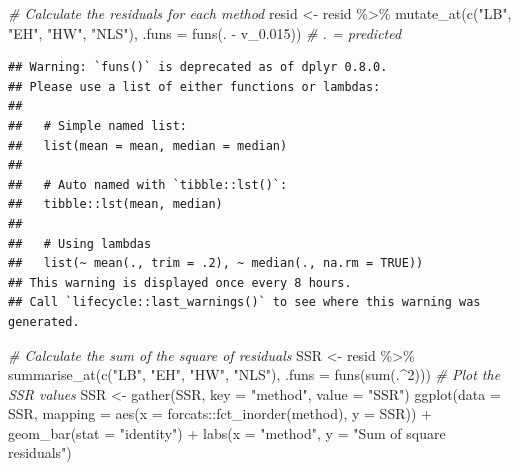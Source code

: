 \documentclass[
]{article}
\newenvironment{Shaded}{\begin{snugshade}}{\end{snugshade}}
\newcommand{\AttributeTok}[1]{\textcolor[rgb]{0.77,0.63,0.00}{#1}}
\newcommand{\CommentTok}[1]{\textcolor[rgb]{0.56,0.35,0.01}{\textit{#1}}}
\newcommand{\DecValTok}[1]{\textcolor[rgb]{0.00,0.00,0.81}{#1}}
\newcommand{\FloatTok}[1]{\textcolor[rgb]{0.00,0.00,0.81}{#1}}
\newcommand{\FunctionTok}[1]{\textcolor[rgb]{0.00,0.00,0.00}{#1}}
\newcommand{\NormalTok}[1]{#1}
\newcommand{\OtherTok}[1]{\textcolor[rgb]{0.56,0.35,0.01}{#1}}
\newcommand{\SpecialCharTok}[1]{\textcolor[rgb]{0.00,0.00,0.00}{#1}}
\newcommand{\StringTok}[1]{\textcolor[rgb]{0.31,0.60,0.02}{#1}}
\begin{document}
\begin{Shaded}
\begin{Highlighting}[]
\CommentTok{\# Calculate the residuals for each method}
\NormalTok{resid }\OtherTok{\textless{}{-}}\NormalTok{ resid }\SpecialCharTok{\%\textgreater{}\%} \FunctionTok{mutate\_at}\NormalTok{(}\FunctionTok{c}\NormalTok{(}\StringTok{"LB"}\NormalTok{, }\StringTok{"EH"}\NormalTok{, }\StringTok{"HW"}\NormalTok{, }\StringTok{"NLS"}\NormalTok{), }
    \AttributeTok{.funs =} \FunctionTok{funs}\NormalTok{(. }\SpecialCharTok{{-}}\NormalTok{ v\_0}\FloatTok{.015}\NormalTok{))  }\CommentTok{\# . = predicted}
\end{Highlighting}
\end{Shaded}

\begin{verbatim}
## Warning: `funs()` is deprecated as of dplyr 0.8.0.
## Please use a list of either functions or lambdas: 
## 
##   # Simple named list: 
##   list(mean = mean, median = median)
## 
##   # Auto named with `tibble::lst()`: 
##   tibble::lst(mean, median)
## 
##   # Using lambdas
##   list(~ mean(., trim = .2), ~ median(., na.rm = TRUE))
## This warning is displayed once every 8 hours.
## Call `lifecycle::last_warnings()` to see where this warning was generated.
\end{verbatim}

\begin{Shaded}
\begin{Highlighting}[]
\CommentTok{\# Calculate the sum of the square of residuals}
\NormalTok{SSR }\OtherTok{\textless{}{-}}\NormalTok{ resid }\SpecialCharTok{\%\textgreater{}\%} \FunctionTok{summarise\_at}\NormalTok{(}\FunctionTok{c}\NormalTok{(}\StringTok{"LB"}\NormalTok{, }\StringTok{"EH"}\NormalTok{, }\StringTok{"HW"}\NormalTok{, }\StringTok{"NLS"}\NormalTok{), }
    \AttributeTok{.funs =} \FunctionTok{funs}\NormalTok{(}\FunctionTok{sum}\NormalTok{(.}\SpecialCharTok{\^{}}\DecValTok{2}\NormalTok{)))}
\CommentTok{\# Plot the SSR values}
\NormalTok{SSR }\OtherTok{\textless{}{-}} \FunctionTok{gather}\NormalTok{(SSR, }\AttributeTok{key =} \StringTok{"method"}\NormalTok{, }\AttributeTok{value =} \StringTok{"SSR"}\NormalTok{)}
\FunctionTok{ggplot}\NormalTok{(}\AttributeTok{data =}\NormalTok{ SSR, }\AttributeTok{mapping =} \FunctionTok{aes}\NormalTok{(}\AttributeTok{x =}\NormalTok{ forcats}\SpecialCharTok{::}\FunctionTok{fct\_inorder}\NormalTok{(method), }
    \AttributeTok{y =}\NormalTok{ SSR)) }\SpecialCharTok{+} \FunctionTok{geom\_bar}\NormalTok{(}\AttributeTok{stat =} \StringTok{"identity"}\NormalTok{) }\SpecialCharTok{+} \FunctionTok{labs}\NormalTok{(}\AttributeTok{x =} \StringTok{"method"}\NormalTok{, }
    \AttributeTok{y =} \StringTok{"Sum of square residuals"}\NormalTok{)}
\end{Highlighting}
\end{Shaded}
\end{document}

